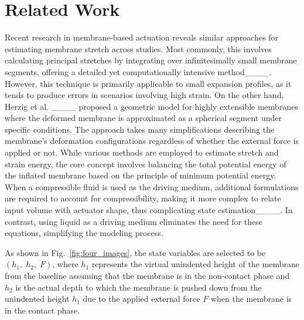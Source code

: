 \section{Related Work}
Recent research in membrane-based actuation reveals similar approaches for estimating membrane stretch across studies. Most commonly, this involves calculating principal stretches by integrating over infinitesimally small membrane segments, offering a detailed yet computationally intensive method____. However, this technique is primarily applicable to small expansion profiles, as it tends to produce errors in scenarios involving high strain. On the other hand, Herzig et al. ____ proposed a geometric model for highly extensible membranes where the deformed membrane is approximated as a spherical segment under specific conditions.  The approach takes many simplifications describing the membrane's deformation configurations regardless of whether the external force is applied or not. While various methods are employed to estimate stretch and strain energy, the core concept involves balancing the total potential energy of the inflated membrane based on the principle of minimum potential energy. When a compressible fluid is used as the driving medium, additional formulations are required to account for compressibility, making it more complex to relate input volume with actuator shape, thus complicating state estimation____. In contrast, using liquid as a driving medium eliminates the need for these equations, simplifying the modeling process.

As shown in Fig.~\ref{fig:four_images}, the state variables are selected to be $(h_1,\;h_2,\; F)$, where $h_1$ represents the virtual unindented height of the membrane from the baseline assuming that the membrane is in the non-contact phase and $h_2$ is the actual depth to which the membrane is pushed down from the unindented height $h_1$ due to the applied external force $F$ when the membrane is in the contact phase.

